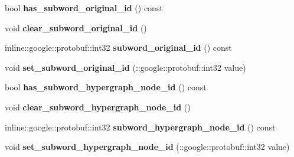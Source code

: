 \begin{DoxyCompactItemize}
\item 
\hypertarget{classlattice_1_1Subword_a8a5d194b546acfd51ab29de9e23eeb69}{
bool {\bfseries has\_\-subword\_\-original\_\-id} () const }
\label{classlattice_1_1Subword_a8a5d194b546acfd51ab29de9e23eeb69}

\item 
\hypertarget{classlattice_1_1Subword_a3aa83e492f090e44f6fcbf14fe739ba5}{
void {\bfseries clear\_\-subword\_\-original\_\-id} ()}
\label{classlattice_1_1Subword_a3aa83e492f090e44f6fcbf14fe739ba5}

\item 
\hypertarget{classlattice_1_1Subword_a279ea67dbaee3bb5635d72b5cdae3e52}{
inline::google::protobuf::int32 {\bfseries subword\_\-original\_\-id} () const }
\label{classlattice_1_1Subword_a279ea67dbaee3bb5635d72b5cdae3e52}

\item 
\hypertarget{classlattice_1_1Subword_a9ed37556521d3f0abb1e3b01850fa190}{
void {\bfseries set\_\-subword\_\-original\_\-id} (::google::protobuf::int32 value)}
\label{classlattice_1_1Subword_a9ed37556521d3f0abb1e3b01850fa190}

\item 
\hypertarget{classlattice_1_1Subword_ac63e04e9d9b551e89e95e7fce5d675a4}{
bool {\bfseries has\_\-subword\_\-hypergraph\_\-node\_\-id} () const }
\label{classlattice_1_1Subword_ac63e04e9d9b551e89e95e7fce5d675a4}

\item 
\hypertarget{classlattice_1_1Subword_a73913395d719789761d67639d4bd7e6e}{
void {\bfseries clear\_\-subword\_\-hypergraph\_\-node\_\-id} ()}
\label{classlattice_1_1Subword_a73913395d719789761d67639d4bd7e6e}

\item 
\hypertarget{classlattice_1_1Subword_aedff8077ae76f04a2cfd99045e69763b}{
inline::google::protobuf::int32 {\bfseries subword\_\-hypergraph\_\-node\_\-id} () const }
\label{classlattice_1_1Subword_aedff8077ae76f04a2cfd99045e69763b}

\item 
\hypertarget{classlattice_1_1Subword_ac125d8a6d580639477e164347e65bfc5}{
void {\bfseries set\_\-subword\_\-hypergraph\_\-node\_\-id} (::google::protobuf::int32 value)}
\label{classlattice_1_1Subword_ac125d8a6d580639477e164347e65bfc5}

\end{DoxyCompactItemize}
